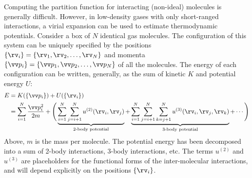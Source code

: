 \bigskip
{}
Computing the partition function
for interacting (non-ideal) molecules is generally difficult.
However, in low-density gases with only short-ranged interactions,
a virial expansion can be used 
to estimate thermodynamic potentials.
Consider a box of $N$ identical gas molecules.
The configuration of this system can be uniquely specified by
the positions  $\{\rv_i\} = \{\rv_1, \rv_2, \ldots, \rv_N\}$
and momenta $\{\vv p_i\} = \{\vv p_1, \vv p_2, \ldots, \vv p_N\} $
of all the molecules.
The energy of each configuration
can be written, generally,
as the sum of kinetic $K$ and potential energy $U$:
\begin{align*}
E &= K(\{\vv p_i\}) + U(\{\rv_i\}) \\
  &= \sum_{i=1}^{N} \frac{\vv p_i^2}{2 m} +  \Biggl(\,
     \underbrace{\sum_{i=1}^N \sum_{j=i+1}^N u^{(2)}(\rv_i, \rv_j)}_\text{2-body potential} +
     \underbrace{\sum_{i=1}^N \sum_{j=i+1}^N \sum_{k=j+1}^N
     u^{(3)}(\rv_i, \rv_j, \rv_k)}_\text{3-body potential}
     + \cdots \Biggr)
\end{align*}
Above, $m$ is the mass per molecule.
The potential energy has been decomposed
into a sum of 2-body interactions, 3-body interactions, etc.
The terms $u^{(2)}$ and $u^{(3)}$ are placeholders
for the functional forms of the inter-molecular interactions,
and will depend explicitly on the positions $\{\rv_i\}$.


